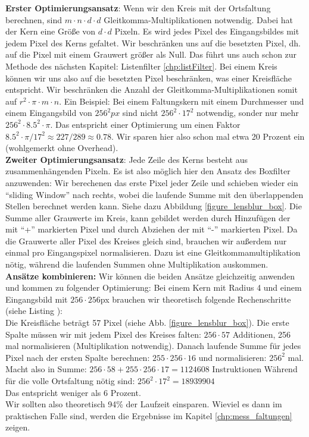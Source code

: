 \documentclass[a4paper,12pt]{article}
\begin{document}
\textbf{Erster Optimierungsansatz}: Wenn wir den Kreis mit der Ortsfaltung
berechnen, sind $m \cdot n \cdot d \cdot d$ Gleitkomma-Multiplikationen
notwendig.
Dabei hat der Kern eine Größe von $d \cdot d$ Pixeln. Es wird jedes Pixel des
Eingangsbildes mit jedem Pixel des Kerns gefaltet. Wir beschränken uns auf die besetzten Pixel,
dh. auf die Pixel mit einem Grauwert größer als Null. Das führt uns auch schon zur
Methode des nächsten Kapitel: Listenfilter \ref{chp:listFilter}. Bei einem Kreis
können wir uns also auf die besetzten Pixel beschränken, was einer Kreisfläche
entspricht. Wir beschränken die Anzahl der Gleitkomma-Multiplikationen somit auf
$r^{2}\cdot \pi \cdot m \cdot n$. Ein Beispiel: Bei einem Faltungskern mit einem
Durchmesser und einem Eingangsbild von $256^{2}px$ sind nicht $256^{2}
\cdot 17^{2}$ notwendig, sonder nur mehr $256^{2} \cdot 8.5^{2} \cdot \pi$. Das
entspricht einer Optimierung um einen Faktor $8.5^{2} \cdot \pi / 17^{2}
\approx 227/289 \approx 0.78 $. Wir sparen hier also schon mal etwa 20 Prozent ein (wohlgemerkt ohne Overhead).\\
\textbf{Zweiter Optimierungsansatz}: Jede Zeile des Kerns besteht aus
zusammenhängenden Pixeln. Es ist also möglich hier den Ansatz des Boxfilter
anzuwenden: Wir berechenen das erste Pixel jeder Zeile und schieben wieder ein
"`sliding Window"' nach rechts, wobei die laufende Summe mit den überlappenden
Stellen berechnet werden kann. Siehe dazu Abbildung \ref{figure_lensblur_box}.
Die Summe aller Grauwerte im Kreis, kann gebildet werden durch Hinzufügen der
mit "`+"' markierten Pixel und durch Abziehen der mit "`-"' markierten Pixel. Da die
Grauwerte aller Pixel des Kreises gleich sind, brauchen wir außerdem nur einmal
pro Eingangspixel normalisieren. Dazu ist eine Gleitkommamultiplikation nötig,
während die laufenden Summen ohne Multiplikation auskommen.\\
\textbf{Ansätze kombinieren:} Wir können die beiden Ansätze gleichzeitig
anwenden und kommen zu folgender Optimierung: Bei einem Kern mit Radius 4 und einem
Eingangsbild mit $256 \cdot 256$px brauchen wir theoretisch folgende
Rechenschritte (siehe Listing ):
\\
Die Kreisfläche beträgt 57 Pixel (siehe Abb. \ref{figure_lensblur_box}).
Die erste Spalte müssen wir mit jedem Pixel des Kreises falten: $256 \cdot 57$
Additionen, 256 mal normalisieren (Multiplikation notwendig). Danach laufende
Summe für jedes Pixel nach der ersten Spalte berechnen: $255 \cdot 256 \cdot 16$
und normalisieren: $256^{2}$ mal. Macht also in Summe: $256 \cdot 58+255
\cdot 256 \cdot 17 = 1124608$ Instruktionen Während für die volle Ortsfaltung
nötig sind:
$256^{2} \cdot 17^{2} = 18939904$ \\
Das entspricht weniger als 6 Prozent.\\
Wir sollten also theoretisch 94\% der Laufzeit einsparen. Wieviel es dann im
praktischen Falle sind, werden die Ergebnisse im Kapitel
\ref{chp:mess_faltungen} zeigen.
 
\end{document}
